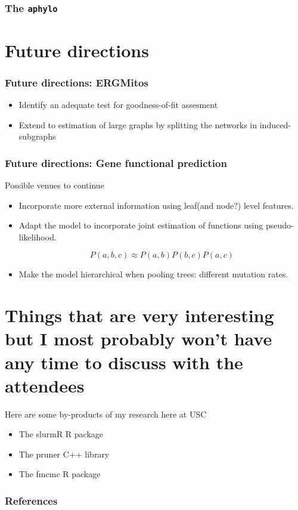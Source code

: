 \documentclass[aspectratio=169, 10pt]{beamer}
\newcommand{\aphylopkg}[0]{\texttt{aphylo}}
\begin{document}
\begin{frame}
\frametitle{The \aphylopkg{}}
\end{frame}


\section{Future directions}
\begin{frame}
\frametitle{Future directions: ERGMitos}

\begin{itemize}
\item Identify an adequate test for goodness-of-fit assesment
\item Extend to estimation of large graphs by splitting the networks in induced-subgraphs
\end{itemize}

\end{frame}

\begin{frame}
\frametitle{Future directions: Gene functional prediction}

Possible venues to continue

\begin{itemize}
\item Incorporate more external information using leaf(and node?) level features.
\item Adapt the model to incorporate joint estimation of functions using pseudo-likelihood.

$$
P(a, b, c) \approx P(a,b)P(b,c)P(a,c)
$$
\item Make the model hierarchical when pooling trees: different mutation rates.
\end{itemize}

\end{frame}


\section{Things that are very interesting but I most probably won't have any time to discuss with the attendees}

\begin{frame}
Here are some by-products of my research here at USC

\begin{itemize}
\item The slurmR R package
\item The pruner C++ library
\item The fmcmc R package
\end{itemize}

\end{frame}

\begin{frame}[allowframebreaks]
\frametitle{References}


\end{frame}
\end{document}
